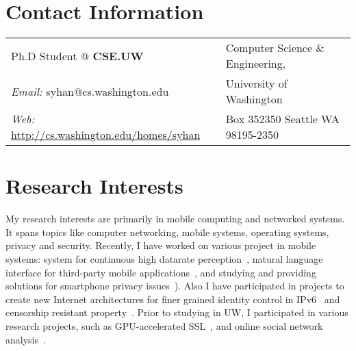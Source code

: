 \documentclass[margin,line]{res}
\begin{document}

\begin{resume}

\section{\sc Contact Information}
\vspace{.05in}

\begin{tabular}{@{}p{3in}p{3in}}
Ph.D Student @ \textbf{CSE.UW}                & Computer Science \& Engineering,\\
{\it Email:} syhan@cs.washington.edu		  &University of Washington    \\
{\it Web:} \url{http://cs.washington.edu/homes/syhan}	  & Box 352350 Seattle WA 98195-2350   \\
\end{tabular}

\section{\sc Research Interests}
My research interests are primarily in mobile computing and networked systems. 
It spans topics like computer networking, mobile systems, operating systems, privacy and security. 
Recently, I have worked on various project in mobile systems: 
system for continuous high datarate perception~\cite{pa14, hotos13}, 
natural language interface for third-party mobile applications~\cite{ubicomp13, hotmobile13}, 
and studying and providing solutions for smartphone privacy
issues~\cite{ccs14,sec14,tocs14,spsm12,nsdi12,ccs2011}).  
Also I have participated in projects to create new Internet architectures for
finer grained identity control in IPv6~\cite{sigcomm13} and censorship
resistant property~\cite{hotnets11}.  Prior to studying in UW, I participated
in various research projects, such as GPU-accelerated SSL~\cite{nsdi11}, 
and online social network analysis~\cite{www07}.



\end{resume}
\end{document}
